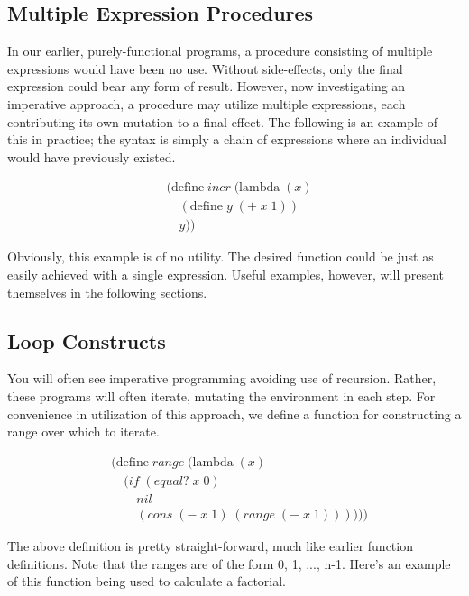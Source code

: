 \subsection{Multiple Expression Procedures}
In our earlier, purely-functional programs, a procedure consisting of multiple 
expressions would have been no use. Without side-effects, only the final expression 
could bear any form of result. However, now investigating an imperative approach, 
a procedure may utilize multiple expressions, each contributing its own mutation to 
a final effect. The following is an example of this in practice; the syntax is 
simply a chain of expressions where an individual would have previously existed.

\begin{figure}[ht]
\caption{}\label{scheme}
\begin{align*}
& (\text{define} \; incr \; (\text{lambda} \; (x)
\\& \quad (\text{define} \; y \; (+ \; x \; 1))
\\& \quad y))
\end{align*}
\end{figure}

Obviously, this example is of no utility. The desired function could be just as 
easily achieved with a single expression. Useful examples, however, will present 
themselves in the following sections.

\subsection{Loop Constructs}
You will often see imperative programming avoiding use of recursion. Rather, these 
programs will often iterate, mutating the environment in each step. For convenience 
in utilization of this approach, we define a function for constructing a range over 
which to iterate.

\begin{figure}[ht]
\caption{}\label{scheme}
\begin{align*}
& (\text{define} \; range \; (\text{lambda} \; (x)
\\& \quad (if \; (equal? \; x \; 0)
\\& \qquad nil
\\& \qquad (cons \; (- \; x \; 1) \; (range \; (- \; x \; 1))))))
\end{align*}
\end{figure}

The above definition is pretty straight-forward, much like earlier function 
definitions. Note that the ranges are of the form 0, 1, ..., n-1. Here's an example 
of this function being used to calculate a factorial.

